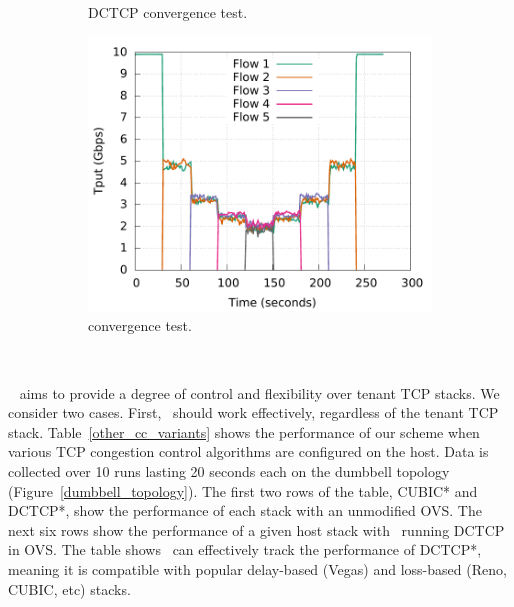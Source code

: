 \begin{figure}[!t]
\begin{subfigure}[b]{0.3\textwidth}
                \caption{DCTCP convergence test.}
                \label{dctcp_convergence}
        \end{subfigure}
        \begin{subfigure}[b]{0.3\textwidth}
                \centering
                \includegraphics[width=\textwidth]{acdctcp/figures/convergence/flowcontrolOFF/ovsdctcp_flowcontrolOFF_convergence.pdf}
                \caption{\acdc{} convergence test.}
                \label{ovsdctcp_convergence}
        \end{subfigure}
        \caption{~}
        \label{convergence_test}
\end{figure}


~\acdc{} aims to provide a degree of control and flexibility over tenant TCP stacks. 
We consider two cases.
First,~\acdc{} should work effectively, regardless of the tenant TCP stack.
Table~\ref{other_cc_variants} shows the performance of our scheme when various TCP congestion control algorithms
are configured on the host. Data is collected over 10 runs lasting 20 seconds each on the dumbbell topology (Figure~\ref{dumbbell_topology}). 
The first two rows of the table, CUBIC* and DCTCP*, show the performance of each stack with an 
unmodified OVS. The next six rows show the performance of a given host stack with~\acdc{} running DCTCP in OVS.
The table shows~\acdc{} can effectively track the performance of DCTCP*, meaning 
it is compatible with popular delay-based (Vegas) and loss-based (Reno, CUBIC, etc) stacks.


